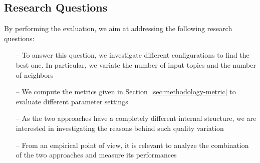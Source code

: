 \subsection{Research Questions} \label{sec:ResearchQuestions}
By performing the evaluation, we aim at addressing the following research questions:
\begin{itemize}
\item[--] \rqfirst To answer this question, we investigate different configurations to find the best one. In particular, we variate the number of input topics and the number of neighbors 
\item[--] \rqsecond We compute the metrics given in Section~\ref{sec:methodology-metric} to evaluate different parameter settings
\item[--] \rqthird As the two approaches have a completely different internal structure, we are interested in investigating the reasons behind such quality variation
\item[--] \rqfourth From an empirical point of view, it is relevant to analyze the combination of the two approaches and measure its performances
\end{itemize}

